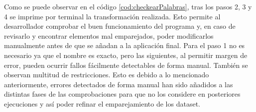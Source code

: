 Como se puede observar en el código \ref{cod:checkearPalabras}, tras los pasos 2, 3 y 4 se imprime por terminal la transformación realizada. Esto permite al desarrollador comprobar el buen funcionamiento del programa y, en caso de revisarlo y encontrar elementos mal emparejados, poder modificarlos manualmente antes de que se añadan a la aplicación final. Para el paso 1 no es necesario ya que el nombre es exacto, pero las siguientes, al permitir margen de error, pueden ocurrir fallos fácilmente detectables de forma manual.
También se observan multitud de restricciones. Esto es debido a lo mencionado anteriormente, errores detectados de forma manual han sido añadidos a las distintas fases de las comprobaciones para que no los considere en posteriores ejecuciones y así poder refinar el emparejamiento de los dataset.




